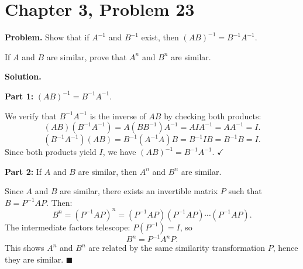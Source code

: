\documentclass[12pt]{article}
\begin{document}
\section*{Chapter 3, Problem 23}

\textbf{Problem.} Show that if $A^{-1}$ and $B^{-1}$ exist, then $(AB)^{-1} = B^{-1}A^{-1}$.

If $A$ and $B$ are similar, prove that $A^n$ and $B^n$ are similar.

\bigskip
\textbf{Solution.}

\textbf{Part 1:} $(AB)^{-1} = B^{-1}A^{-1}$.

We verify that $B^{-1}A^{-1}$ is the inverse of $AB$ by checking both products:
\[
(AB)(B^{-1}A^{-1}) = A(BB^{-1})A^{-1} = AIA^{-1} = AA^{-1} = I.
\]
\[
(B^{-1}A^{-1})(AB) = B^{-1}(A^{-1}A)B = B^{-1}IB = B^{-1}B = I.
\]
Since both products yield $I$, we have $(AB)^{-1} = B^{-1}A^{-1}$. \hfill $\checkmark$

\bigskip
\textbf{Part 2:} If $A$ and $B$ are similar, then $A^n$ and $B^n$ are similar.

Since $A$ and $B$ are similar, there exists an invertible matrix $P$ such that $B = P^{-1}AP$. Then:
\[
B^n = (P^{-1}AP)^n = (P^{-1}AP)(P^{-1}AP)\cdots(P^{-1}AP).
\]
The intermediate factors telescope: $P(P^{-1}) = I$, so
\[
B^n = P^{-1}A^n P.
\]
This shows $A^n$ and $B^n$ are related by the same similarity transformation $P$, hence they are similar. \hfill $\blacksquare$
\end{document}
